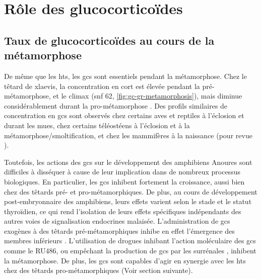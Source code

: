 \documentclass[../main.tex]{subfiles}
\begin{document}


\section{Rôle des glucocorticoïdes}

\subsection{Taux de glucocorticoïdes au cours de la métamorphose}

De même que les \glspl{ht}, les \glspl{gc} sont essentiels pendant la métamorphose.
Chez le têtard de \gls{xlaevis}, la concentration en \gls{cort} est élevée pendant la pré-métamorphose, et le climax (\gls{snf} 62, \autoref{fig:gc-gr-metamorphosis}), mais diminue considérablement durant la pro-métamorphose \citep{JolivetJaudet1984,Kloas1997}.
Des profils similaires de concentration en \glspl{gc} sont observés chez certains aves et reptiles à l'éclosion et durant les mues, chez certains téléostéens à l'éclosion et à la métamorphose/smoltification, et chez les mammifères à la naissance (pour revue \citealp{Wada2008}).



Toutefois, les actions des \glspl{gc} sur le développement des amphibiens Anoures sont difficiles à disséquer à cause de leur implication dans de nombreux processus biologiques.
En particulier, les \glspl{gc} inhibent fortement la croissance, aussi bien chez des têtards pré- et pro-métamorphiques.
De plus, au cours de développement post-embryonnaire des amphibiens, leurs effets varient selon le stade et le statut thyroïdien, ce qui rend l'isolation de leurs effets spécifiques indépendants des autres voies de signalisation endocrines malaisée.
L'administration de \glspl{gc} exogènes à des têtards pré-métamorphiques inhibe en effet l'émergence des membres inférieurs \citep{Kobayashi1958}.
L'utilisation de drogues inhibant l'action moléculaire des \glspl{gc} comme le RU486, ou empêchant la production de \glspl{gc} par les surrénales \citep{Kikuyama1982}, inhibent la métamorphose.
De plus, les \glspl{gc} sont capables d'agir en synergie avec les \glspl{ht} chez des têtards pro-métamorphiques \citep{Hayes1993a,Hayes1994,Gray1990} (Voir section suivante).
\end{document}
